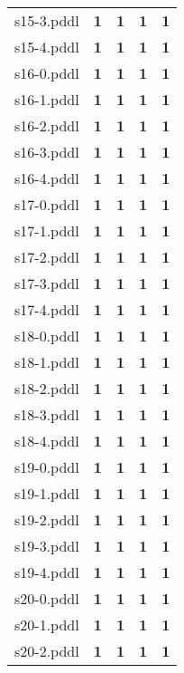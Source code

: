 \documentclass{article}
\begin{document}
\begin{tabular}{@{}lrrrr@{}}
s15-3.pddl & \textbf{1} & \textbf{1} & \textbf{1} & \textbf{1} \\
s15-4.pddl & \textbf{1} & \textbf{1} & \textbf{1} & \textbf{1} \\
s16-0.pddl & \textbf{1} & \textbf{1} & \textbf{1} & \textbf{1} \\
s16-1.pddl & \textbf{1} & \textbf{1} & \textbf{1} & \textbf{1} \\
s16-2.pddl & \textbf{1} & \textbf{1} & \textbf{1} & \textbf{1} \\
s16-3.pddl & \textbf{1} & \textbf{1} & \textbf{1} & \textbf{1} \\
s16-4.pddl & \textbf{1} & \textbf{1} & \textbf{1} & \textbf{1} \\
s17-0.pddl & \textbf{1} & \textbf{1} & \textbf{1} & \textbf{1} \\
s17-1.pddl & \textbf{1} & \textbf{1} & \textbf{1} & \textbf{1} \\
s17-2.pddl & \textbf{1} & \textbf{1} & \textbf{1} & \textbf{1} \\
s17-3.pddl & \textbf{1} & \textbf{1} & \textbf{1} & \textbf{1} \\
s17-4.pddl & \textbf{1} & \textbf{1} & \textbf{1} & \textbf{1} \\
s18-0.pddl & \textbf{1} & \textbf{1} & \textbf{1} & \textbf{1} \\
s18-1.pddl & \textbf{1} & \textbf{1} & \textbf{1} & \textbf{1} \\
s18-2.pddl & \textbf{1} & \textbf{1} & \textbf{1} & \textbf{1} \\
s18-3.pddl & \textbf{1} & \textbf{1} & \textbf{1} & \textbf{1} \\
s18-4.pddl & \textbf{1} & \textbf{1} & \textbf{1} & \textbf{1} \\
s19-0.pddl & \textbf{1} & \textbf{1} & \textbf{1} & \textbf{1} \\
s19-1.pddl & \textbf{1} & \textbf{1} & \textbf{1} & \textbf{1} \\
s19-2.pddl & \textbf{1} & \textbf{1} & \textbf{1} & \textbf{1} \\
s19-3.pddl & \textbf{1} & \textbf{1} & \textbf{1} & \textbf{1} \\
s19-4.pddl & \textbf{1} & \textbf{1} & \textbf{1} & \textbf{1} \\
s20-0.pddl & \textbf{1} & \textbf{1} & \textbf{1} & \textbf{1} \\
s20-1.pddl & \textbf{1} & \textbf{1} & \textbf{1} & \textbf{1} \\
s20-2.pddl & \textbf{1} & \textbf{1} & \textbf{1} & \textbf{1} \\

\end{tabular}
\end{document}
